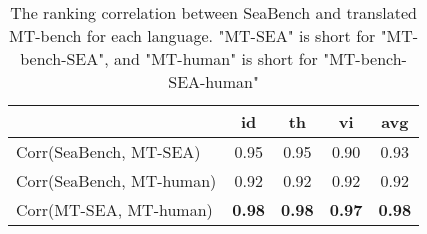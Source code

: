 \begin{table}[h!]
\centering
\setlength\tabcolsep{4.5pt}
\small
\begin{tabular}{lcccc}
\toprule
 & \textbf{id} & \textbf{th} & \textbf{vi} & \textbf{avg} \\
\midrule
Corr(SeaBench, MT-SEA) & 0.95 & 0.95 & 0.90 & 0.93 \\
Corr(SeaBench, MT-human) & 0.92 & 0.92 & 0.92 & 0.92 \\
Corr(MT-SEA, MT-human) & \textbf{0.98} & \textbf{0.98} & \textbf{0.97} & \textbf{0.98} \\

\bottomrule
\end{tabular}
\caption{The ranking correlation between SeaBench and translated MT-bench for each language. "MT-SEA" is short for "MT-bench-SEA", and "MT-human" is short for "MT-bench-SEA-human"}
\label{tab:corr_seabench_lang}
\end{table}

